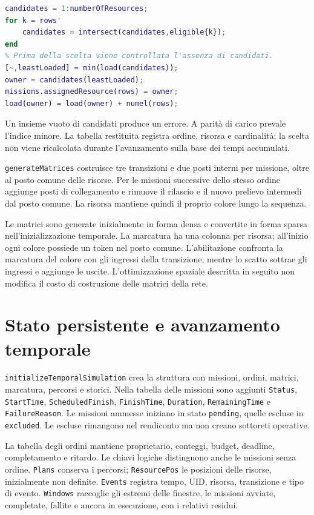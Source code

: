 \begin{lstlisting}[language=Matlab,caption={Estratto della scelta della risorsa proprietaria.},label={lst:impl-owner}]
candidates = 1:numberOfResources;
for k = rows'
    candidates = intersect(candidates,eligible{k});
end
% Prima della scelta viene controllata l'assenza di candidati.
[~,leastLoaded] = min(load(candidates));
owner = candidates(leastLoaded);
missions.assignedResource(rows) = owner;
load(owner) = load(owner) + numel(rows);
\end{lstlisting}

Un insieme vuoto di candidati produce un errore. A parità di carico prevale
l'indice minore. La tabella restituita registra ordine, risorsa e cardinalità;
la scelta non viene ricalcolata durante l'avanzamento sulla base dei tempi
accumulati.

\texttt{generateMatrices} costruisce tre transizioni e due posti interni
per missione, oltre al posto comune delle risorse. Per le missioni successive
dello stesso ordine aggiunge posti di collegamento e rimuove il rilascio
e il nuovo prelievo intermedi dal posto comune. La risorsa mantiene quindi
il proprio colore lungo la sequenza.

Le matrici sono generate inizialmente in forma densa e convertite in forma
sparsa nell'inizializzazione temporale. La marcatura ha una colonna per
risorsa; all'inizio ogni colore possiede un token nel posto comune.
L'abilitazione confronta la marcatura del colore con gli ingressi della
transizione, mentre lo scatto sottrae gli ingressi e aggiunge le uscite.
L'ottimizzazione spaziale descritta in seguito non modifica il costo di
costruzione delle matrici della rete.
\section{Stato persistente e avanzamento temporale}
\label{sec:impl-stato}

\texttt{initializeTemporalSimulation} crea la struttura con missioni,
ordini, matrici, marcatura, percorsi e storici. Nella tabella delle missioni
sono aggiunti \texttt{Status}, \texttt{StartTime},
\texttt{ScheduledFinish}, \texttt{FinishTime}, \texttt{Duration},
\texttt{RemainingTime} e \texttt{FailureReason}. Le missioni ammesse
iniziano in stato \texttt{pending}, quelle escluse in \texttt{excluded}.
Le escluse rimangono nel rendiconto ma non creano sottoreti operative.

La tabella degli ordini mantiene proprietario, conteggi, budget, deadline,
completamento e ritardo. Le chiavi logiche distinguono anche le missioni
senza ordine. \texttt{Plans} conserva i percorsi; \texttt{ResourcePos}
le posizioni delle risorse, inizialmente non definite. \texttt{Events}
registra tempo, UID, risorsa, transizione e tipo di evento.
\texttt{Windows} raccoglie gli estremi delle finestre, le missioni avviate,
completate, fallite e ancora in esecuzione, con i relativi residui.

